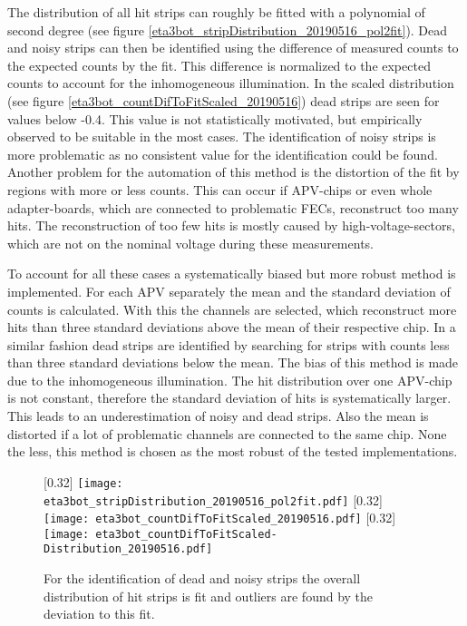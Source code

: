 \documentclass[
twoside,            %
BCOR1.4cm,          %
10pt,               %
headings=normal,    %
headsepline,        %
clearplainpage,		%
final,              %
div=14,
open=right,
bibliography=toc
]{scrreprt}
\begin{document}
The distribution of all hit strips can roughly be fitted with a polynomial of second degree (see figure \ref{eta3bot_stripDistribution_20190516_pol2fit}).
Dead and noisy strips can then be identified using the difference of measured counts to the expected counts by the fit.
This difference is normalized to the expected counts to account for the inhomogeneous illumination.
In the scaled distribution (see figure \ref{eta3bot_countDifToFitScaled_20190516}) dead strips are seen for values below -0.4.
This value is not statistically motivated, but empirically observed to be suitable in the most cases.
The identification of noisy strips is more problematic as no consistent value for the identification could be found.
Another problem for the automation of this method is the distortion of the fit by regions with more or less counts.
This can occur if APV-chips or even whole adapter-boards, which are connected to problematic FECs, reconstruct too many hits.
The reconstruction of too few hits is mostly caused by high-voltage-sectors, which are not on the nominal voltage during these measurements.

To account for all these cases a systematically biased but more robust method is implemented.
For each APV separately the mean and the standard deviation of counts is calculated.
With this the channels are selected, which reconstruct more hits than three standard deviations above the mean of their respective chip.
In a similar fashion dead strips are identified by searching for strips with counts less than three standard deviations below the mean.
The bias of this method is made due to the inhomogeneous illumination.
The hit distribution over one APV-chip is not constant, therefore the standard deviation of hits is systematically larger.
This leads to an underestimation of noisy and dead strips.
Also the mean is distorted if a lot of problematic channels are connected to the same chip.
None the less, this method is chosen as the most robust of the tested implementations.

\begin{figure}[!h]
	\centering
	[0.32\textwidth]
	{\texttt{[image: eta3bot\_stripDistribution\_20190516\_pol2fit.pdf]}}
	\hfill
	[0.32\textwidth]
	{\texttt{[image: eta3bot\_countDifToFitScaled\_20190516.pdf]}}
	\hfill
	[0.32\textwidth]
	{\texttt{[image: eta3bot\_countDifToFitScaled-Distribution\_20190516.pdf]}}
	\vspace{-2mm}
	\caption{
		For the identification of dead and noisy strips the overall distribution of hit strips is fit and outliers are found by the deviation to this fit.
	}
	\label{eta3bot_deadStripIdentification} 
\end{figure}
\end{document}
